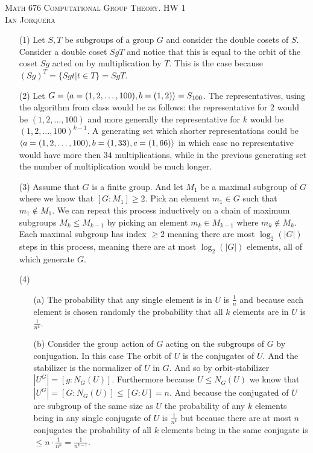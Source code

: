 \documentclass[12pt]{amsart}
\begin{document}
\begin{center}
   \textsc{Math 676 Computational Group Theory. HW 1\\ Ian Jorquera}
\end{center}
\vspace{1em}

\begin{itemize}
   \item[(1)]
   Let $S,T$ be subgroups of a group $G$ and consider the double 
   cosets of $S$. Consider a double coset $SgT$ and notice that this is equal to the 
   orbit of the coset $Sg$ acted on by multiplication by $T$. This is the 
   case because $(Sg)^T=\{Sgt | t\in T\}=SgT$.
   
   

   \item[(2)] Let $G=\left\langle a=(1,2,\dots,100), b= (1,2) \right\rangle=S_{100}$. The representatives, 
   using the algorithm from class would be as follows: the representative for $2$ would
    be $(1,2,\dots,100)$ and more generally the representative for $k$ would be
    $(1,2,\dots,100)^{k-1}$. A generating set which shorter representations could be 
    $\left\langle a=(1,2,\dots,100), b= (1,33), c=(1,66) \right\rangle$ in which case no representative would
    have more then $34$ multiplications, while in the previous generating set the 
    number of multiplication would be much longer.
   
    \item[(3)] Assume that $G$ is a finite group. And let $M_1$ be a maximal subgroup of $G$
               where we know that $[G:M_1]\geq 2$. Pick an element $m_1\in G$ 
               such that $m_1\not\in M_1$. We can repeat this process inductively on a
               chain of maximum subgroups $M_{k}\leq M_{k-1}$ by
               picking an element $m_k\in M_{k-1}$ where $m_k\not\in M_k$. Each maximal subgroup has
               index $\geq 2$ meaning there are most $\log_2(|G|)$ steps in this process, 
               meaning there are at most $\log_2(|G|)$ elements, all of which generate $G$.

   \item[(4)] 
   \begin{itemize}
      \item[(a)] The probability that any single element is in $U$ is $\frac{1}{n}$ and 
      because each element is chosen randomly the probability that all $k$ elements are in $U$
      is $\frac{1}{n^k}$.
      \item[(b)] Consider the group action of $G$ acting on the subgroups of $G$ by conjugation.
                 In this case The orbit of $U$ is the conjugates of $U$. And the stabilizer
                 is the normalizer of $U$ in $G$. And so by orbit-stabilizer $|U^G|=[g:N_G(U)]$. Furthermore 
                 because $U\leq N_G(U)$ we know that $|U^G|=[G:N_G(U)]\leq [G:U] =n$. And 
                 because the conjugated of $U$ are subgroup of the same size as $U$ the probability 
                 of any $k$ elements being in any single conjugate of $U$ is $\frac{1}{n^k}$ 
                 but because there are at most $n$ conjugates the probability of all $k$ elements 
                 being in the same conjugate is $\leq n\cdot\frac{1}{n^k}=\frac{1}{n^{k-1}}$.



\end{itemize}
\end{itemize}
\end{document}
